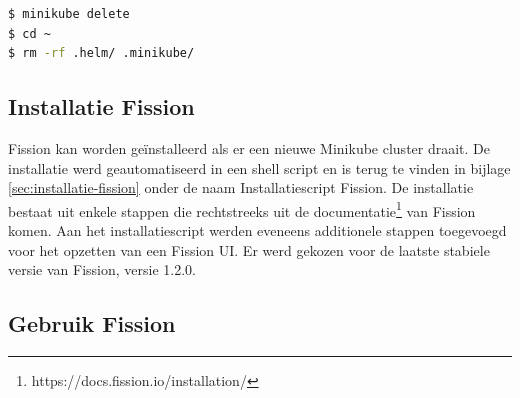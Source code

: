 \begin{lstlisting}[language=bash]
$ minikube delete
$ cd ~
$ rm -rf .helm/ .minikube/
\end{lstlisting}

\subsection{Installatie Fission}
Fission kan worden geïnstalleerd als er een nieuwe Minikube cluster draait. De installatie werd geautomatiseerd in een shell script en is terug te vinden in bijlage \ref{sec:installatie-fission} onder de naam Installatiescript Fission. De installatie bestaat uit enkele stappen die rechtstreeks uit de documentatie\footnote{https://docs.fission.io/installation/} van Fission komen. Aan het installatiescript werden eveneens additionele stappen toegevoegd voor het opzetten van een Fission UI. Er werd gekozen voor de laatste stabiele versie van Fission, versie 1.2.0.

\subsection{Gebruik Fission}
